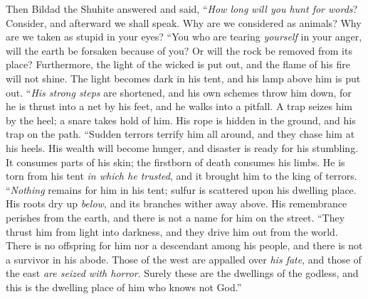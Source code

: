 \begin{biblechapter} %
 Then Bildad the Shuhite answered and said,
\verse “\textit{How long} \textit{will you hunt for words}? 
Consider, and afterward we shall speak.
\verse Why are we considered as animals? 
Why are we taken as stupid in your eyes?
\verse “You who are tearing \textit{yourself} in your anger, 
will the earth be forsaken because of you? 
Or will the rock be removed from its place?
\verse Furthermore, the light of the wicked is put out, 
and the flame of his fire will not shine.
\verse The light becomes dark in his tent, 
and his lamp above him is put out.
\verse “\textit{His strong steps} are shortened, 
and his own schemes throw him down,
\verse for he is thrust into a net by his feet, 
and he walks into a pitfall.
\verse A trap seizes him by the heel; 
a snare takes hold of him.
\verse His rope is hidden in the ground, 
and his trap on the path.
\verse “Sudden terrors terrify him all around, 
and they chase him at his heels.
\verse His wealth will become hunger, 
and disaster is ready for his stumbling.
\verse It consumes parts of his skin; 
the firstborn of death consumes his limbs.
\verse He is torn from his tent \textit{in which he trusted}, 
and it brought him to the king of terrors.
\verse “\textit{Nothing} remains for him in his tent; 
sulfur is scattered upon his dwelling place.
\verse His roots dry up \textit{below}, 
and its branches wither away above.
\verse His remembrance perishes from the earth, 
and there is not a name for him on the street.
\verse “They thrust him from light into darkness, 
and they drive him out from the world.
\verse There is no offspring for him nor a descendant among his people, 
and there is not a survivor in his abode.
\verse Those of the west are appalled over \textit{his fate}, 
and those of the east \textit{are seized with horror}.
\verse Surely these are the dwellings of the godless, 
and this is the dwelling place of him who knows not God.”
\end{biblechapter}

